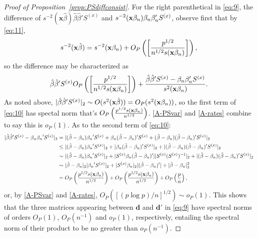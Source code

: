 \documentclass{article}
\theoremstyle{remark}
\begin{document}
\begin{proof}[Proof of Proposition~\ref{prop:PSdiffconsist}]
For the right parenthetical in \eqref{eq:9}, the difference of ${s^{-2}(\mathbf{x}\hat\beta)} {\hat\beta\hat{\beta}'S^{(x)}} $ and $ {s^{-2}(\mathbf{x}\beta_{n })}{\beta_{n }\beta_{n }'S^{(x)}}$, observe first that by 
\eqref{eq:11},
\begin{equation}
 s^{-2}(\mathbf{x}\hat\beta) = s^{-2}(\mathbf{x}\beta_{n }) + O_{P}\left(\left[\frac{p^{1/2}}{n^{1/2}s(\mathbf{x}\beta_{n })}\right]\right) , \label{eq:1}
\end{equation}
so the difference may be characterized as
\begin{equation} \label{eq:10}
{\hat\beta\hat{\beta}'S^{(x)}} O_{P}\left(\left[\frac{p^{1/2}}{n^{1/2}s(\mathbf{x}\beta_{n })}\right]\right) + 
\frac{\hat\beta\hat{\beta}'S^{(x)} - \beta_{n }\beta_{n }'S^{(x)}}{s^{2}(\mathbf{x}\beta_{n })}.
\end{equation}
As noted above, $|\hat\beta\hat{\beta}'S^{(x)} |_{2} \sim O(s^{2}(\mathbf{x}\hat\beta)) = O_{P}(s^{2}(\mathbf{x}\beta_{n }))$, so the first term of \eqref{eq:10} has spectal norm that's $O_{P}\left(\frac{p^{1/2}s(\mathbf{x}\beta_{n })}{n^{1/2}} \right)$. \ref{A-PSvar} and \ref{A-rates} combine to say this is $o_{P}(1)$. As to the second term of \eqref{eq:10}:
\begin{align*}
|\hat\beta\hat{\beta}'S^{(x)} - \beta_{n }{\beta_{n }}'S^{(x)}|_{2} &= |(\hat\beta-\beta_{n }){\beta_{n }}'S^{(x)} + \beta_{n }(\hat\beta - \beta_{n })'S^{(x)} + (\hat\beta -\beta_{n })(\hat\beta - \beta_{n })'S^{(x)}|_{2} \\
&\leq |(\hat\beta-\beta_{n }){\beta_{n }}'S^{(x)}|_{2} + |\beta_{n }(\hat\beta - \beta_{n })'S^{(x)}|_{2} +| (\hat\beta -\beta_{n })(\hat\beta - \beta_{n })'S^{(x)}|_{2}\\
&\sim |(\hat\beta-\beta_{n }){\beta_{n }}'S^{(x)}|_{2} + |S^{(x)}\beta_{n }(\hat\beta - \beta_{n })'||S^{(x)} (S^{(x)})^{-1}|_{2} +|  (\hat\beta -\beta_{n })(\hat\beta - \beta_{n })'S^{(x)}|_{2}\\
&\sim |\hat\beta-\beta_{n }|_{2} |{\beta_{n }}'S^{(x)}|_{2} + |S^{(x)}\beta_{n }|_{2}|(\hat\beta - \beta_{n })'| +|  
\hat\beta -\beta_{n }|_{2}^{2}\\
&= O_{P}\left(\frac{p^{1/2}s(\mathbf{x}\beta_{n })}{n^{1/2}}\right) + O_{P}\left(\frac{p^{1/2}s(\mathbf{x}\beta_{n })}{n^{1/2}}\right) + O_{P}\left(\frac{p}{n}\right),
\end{align*} 
or, by \ref{A-PSvar} and \ref{A-rates}, $O_{P}\left([(p\log p)/n]^{1/2}\right) \sim o_{P}(1)$. This shows that the three matrices appearing between $\mathbf{d}$ and $\mathbf{d}'$ in \eqref{eq:9} have spectral norms of orders $O_{P}(1)$, $O_{P}(n^{-1})$ and $o_{P}(1)$, respectively, entailing the spectral norm of their product to be no greater than $o_{P}(n^{-1})$.
\end{proof}
\end{document}
